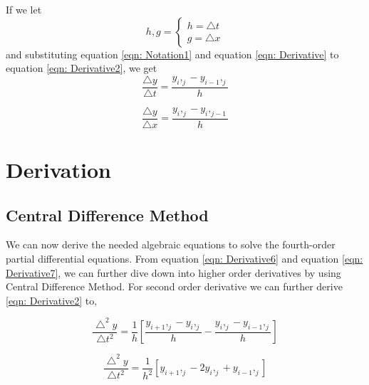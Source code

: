 \documentclass[conference]{IEEEtran}
\begin{document}
	If we let
	\begin{equation}
		h,g = 
		\begin{cases}
			h = \bigtriangleup t\\
			g = \bigtriangleup x
		\end{cases}
	\end{equation}
	and substituting equation \eqref{eqn: Notation1} and equation \eqref{eqn: Derivative} to equation \eqref{eqn: Derivative2}, we get
	\begin{equation}
		\label{eqn: Derivative6}
		\frac{\bigtriangleup y}{\bigtriangleup t} = \frac{y_{i},_{j} - y_{i-1},_{j}}{h}
	\end{equation}

	\begin{equation}
		\label{eqn: Derivative7}
		\frac{\bigtriangleup y}{\bigtriangleup x} = \frac{y_{i},_{j} - y_{i},_{j-1}}{h}
	\end{equation}
	
	\section{Derivation}
	\subsection{Central Difference Method}
	We can now derive the needed algebraic equations to solve the fourth-order partial differential equations. 
	From equation \eqref{eqn: Derivative6} and equation \eqref{eqn: Derivative7}, we can further dive down into higher order derivatives by using Central Difference Method. For second order derivative we can further derive \eqref{eqn: Derivative2} to,
	
	
	\begin{equation}
		\label{eqn: Derivative8}
		\frac{\bigtriangleup^2 y}{\bigtriangleup t^2} =\frac{1}{h}\left[\frac{y_{i+1},_{j} - y_{i},_{j}}{h} - \frac{y_{i},_{j} - y_{i-1},_{j}}{h} \right]
	\end{equation}
	
	\begin{equation}
		\label{eqn: Derivative9}
		\frac{\bigtriangleup^2 y}{\bigtriangleup t^2} =\frac{1}{h^2}\left[{y_{i+1},_{j} - 2 y_{i},_{j} + y_{i-1},_{j}} \right]
	\end{equation}
	
\end{document}
